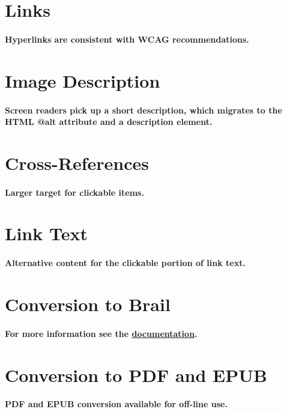 \documentclass{article}
\begin{document}
\section{Links}
\paragraph{
Hyperlinks are consistent with WCAG recommendations.
}

\section{Image Description}
\paragraph{
Screen readers pick up a short description, which migrates to the HTML @alt attribute and a description element.
}

\section{Cross-References}
\paragraph{
Larger target for clickable items.
}

\section{Link Text}
\paragraph{
Alternative content for the clickable portion of link text.
}

\section{Conversion to Brail}
\paragraph{
For more information see the \href{https://pretextbook.org/doc/guide/html/publisher-braille.html}{documentation}.
}

\section{Conversion to PDF and EPUB}
\paragraph{
PDF and EPUB conversion available for off-line use.
}
\end{document}
